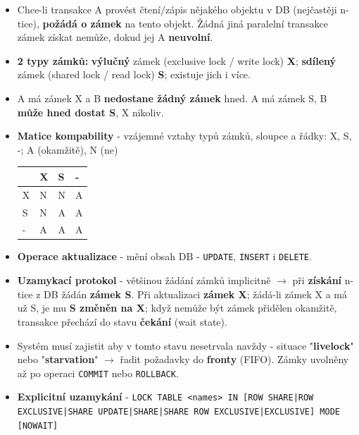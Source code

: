 \begin{itemize}
\item Chce-li transakce A provést čtení/zápis nějakého objektu v DB (nejčastěji n-tice), \textbf{požádá o zámek} na tento objekt. Žádná jiná paralelní transakce zámek získat nemůže, dokud jej A \textbf{neuvolní}.
\item \textbf{2 typy zámků:} \textbf{výlučný} zámek (exclusive lock / write lock) \textbf{X}; \textbf{sdílený} zámek (shared lock / read lock) \textbf{S}; existuje jich i více.
\item A má zámek X a B \textbf{nedostane žádný zámek} hned. A má zámek S, B \textbf{může hned dostat S}, X nikoliv.
\item \textbf{Matice kompability} - vzájemné vztahy typů zámků, sloupce a řádky: X, S, -; A (okamžitě), N (ne)
\begin{table}[H]
	\centering
	\begin{tabular}{|l|l|l|l|}
		\hline
		& X & S & - \\ \hline
		X & N & N & A \\ \hline
		S & N & A & A \\ \hline
		- & A & A & A \\ \hline
	\end{tabular}
\end{table}
\item \textbf{Operace aktualizace} - mění obsah DB - \texttt{UPDATE}, \texttt{INSERT} i \texttt{DELETE}.
\item \textbf{Uzamykací protokol} - většinou žádání zámků implicitně $\rightarrow$ při \textbf{získání} n-tice z DB žádán \textbf{zámek S}. Při aktualizaci \textbf{zámek X}; žádá-li zámek X a má už S, je mu \textbf{S změněn na X}; když nemůže být zámek přidělen okamžitě, transakce přechází do stavu \textbf{čekání} (wait state).
\item Systém musí zajistit aby v tomto stavu nesetrvala navždy - situace "\textbf{livelock}" nebo "\textbf{starvation}" $\rightarrow$ řadit požadavky do \textbf{fronty} (FIFO). Zámky uvolněny až po operaci \texttt{COMMIT} nebo \texttt{ROLLBACK}.
\item \textbf{Explicitní uzamykání} - \texttt{LOCK TABLE <names> IN [ROW SHARE|ROW EXCLUSIVE|SHARE UPDATE|SHARE|SHARE ROW EXCLUSIVE|EXCLUSIVE] MODE [NOWAIT]}
\end{itemize}

